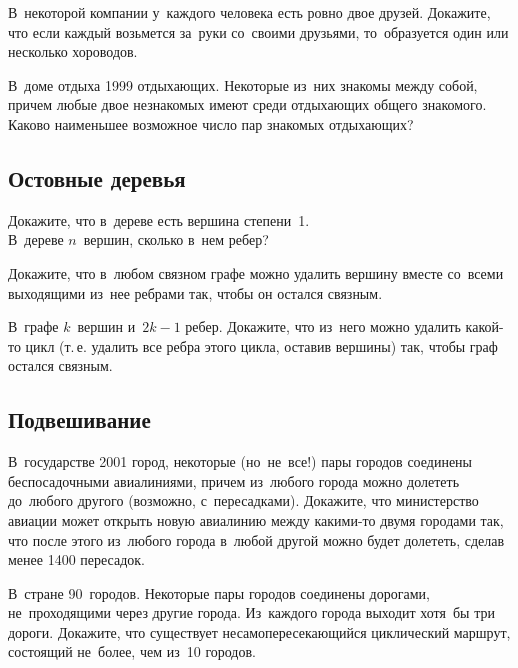 


\begin{problems}

\item
В~некоторой компании у~каждого человека есть ровно двое друзей.
Докажите, что если каждый возьмется за~руки со~своими друзьями, то~образуется
один или несколько хороводов.

\item
В~доме отдыха 1999 отдыхающих.
Некоторые из~них знакомы между собой, причем любые двое незнакомых имеют среди
отдыхающих общего знакомого.
Каково наименьшее возможное число пар знакомых отдыхающих?

\end{problems}


\subsection*{Остовные деревья}

\begin{problems}

\item
\subproblem
Докажите, что в~дереве есть вершина степени~1.
\\
\subproblem
В~дереве $n$~вершин, сколько в~нем ребер?

\item
Докажите, что в~любом связном графе можно удалить вершину вместе со~всеми
выходящими из~нее ребрами так, чтобы он остался связным.

\item
В~графе $k$~вершин и~$2 k - 1$ ребер.
Докажите, что из~него можно удалить какой-то цикл (т.\,е. удалить все ребра
этого цикла, оставив вершины) так, чтобы граф остался связным.

\end{problems}


\subsection*{Подвешивание}

\begin{problems}

\item
В~государстве 2001 город, некоторые (но~не~все!) пары городов соединены
беспосадочными авиалиниями, причем из~любого города можно долететь до~любого
другого (возможно, с~пересадками).
Докажите, что министерство авиации может открыть новую авиалинию между
какими-то двумя городами так, что после этого из~любого города в~любой другой
можно будет долететь, сделав менее 1400 пересадок.

\item
В~стране 90~городов.
Некоторые пары городов соединены дорогами, не~проходящими через другие города.
Из~каждого города выходит хотя~бы три дороги.
Докажите, что существует несамопересекающийся циклический маршрут, состоящий
не~более, чем из~10 городов.

\end{problems}


